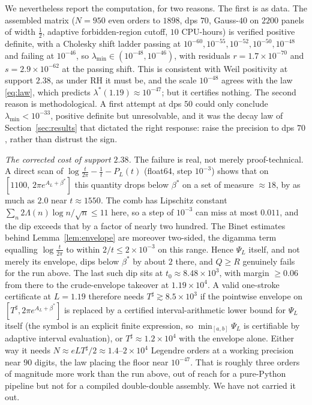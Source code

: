 ﻿\documentclass[11pt]{article}
\newcommand{\lmin}{\lambda^{*}}
\newcommand{\lammin}{\lambda_{\min}}
\newcommand{\Tsharp}{T^{\sharp}}
\begin{document}
We nevertheless report the computation, for two reasons.  The first is
as data.  The assembled matrix ($N=950$ even orders to $1898$, dps
$70$, Gauss-$40$ on $2200$ panels of width $\frac12$, adaptive
forbidden-region cutoff, $10$ CPU-hours) is verified positive definite,
with a Cholesky shift ladder passing at
$10^{-60},10^{-55},10^{-52},10^{-50},10^{-48}$ and failing at
$10^{-46}$, so $\lammin\in(10^{-48},10^{-46})$, with residuals
$r=1.7\times10^{-70}$ and $s=2.9\times10^{-62}$ at the passing shift.
This is consistent with Weil positivity at support $2.38$, as under RH
it must be, and the scale $10^{-48}$ agrees with the law
\eqref{eq:law}, which predicts $\lmin(1.19)\approx10^{-47}$; but it
certifies nothing.  The second reason is methodological.  A first
attempt at dps $50$ could only conclude $\lammin<10^{-33}$, positive
definite but unresolvable, and it was the decay law of
Section~\ref{sec:results} that dictated the right response: raise the
precision to dps $70$, rather than distrust the sign.

\emph{The corrected cost of support $2.38$.}  The failure is real, not
merely proof-technical.  A direct scan of
$\log\frac t{2\pi}-\frac1t-P_L(t)$ (float64, step $10^{-3}$) shows
that on $[1100,\,2\pi e^{A_L+\beta^*}]$ this quantity drops below
$\beta^*$ on a set of measure $\approx18$, by as much as $2.0$ near
$t\approx1550$.  The comb has Lipschitz constant
$\sum_n 2\Lambda(n)\log n/\sqrt n\le11$ here, so a step of $10^{-3}$
can miss at most $0.011$, and the dip exceeds that by a factor of
nearly two hundred.  The Binet estimates behind
Lemma~\ref{lem:envelope} are moreover two-sided, the digamma term
equalling $\log\frac t{2\pi}$ to within $2/t\le2\times10^{-3}$ on this
range.  Hence $\Psi_L$ itself, and not merely its envelope, dips below
$\beta^*$ by about $2$ there, and $Q\ge R$ genuinely fails for the run
above.  The last such dip sits at $t_0\approx8.48\times10^3$, with
margin $\ge0.06$ from there to the crude-envelope takeover at
$1.19\times10^4$.  A valid one-stroke certificate at $L=1.19$
therefore needs $\Tsharp\gtrsim8.5\times10^3$ if the pointwise
envelope on $[\Tsharp,2\pi e^{A_L+\beta^*}]$ is replaced by a
certified interval-arithmetic lower bound for $\Psi_L$ itself (the
symbol is an explicit finite expression, so $\min_{[a,b]}\Psi_L$ is
certifiable by adaptive interval evaluation), or
$\Tsharp\approx1.2\times10^4$ with the envelope alone.  Either way it
needs $N\approx eL\Tsharp/2\approx1.4$--$2\times10^4$ Legendre orders
at a working precision near $90$ digits, the law placing the floor
near $10^{-47}$.  That is roughly three orders of magnitude more work
than the run above, out of reach for a pure-Python pipeline but not
for a compiled double-double assembly.  We have not carried it out.
\end{document}
